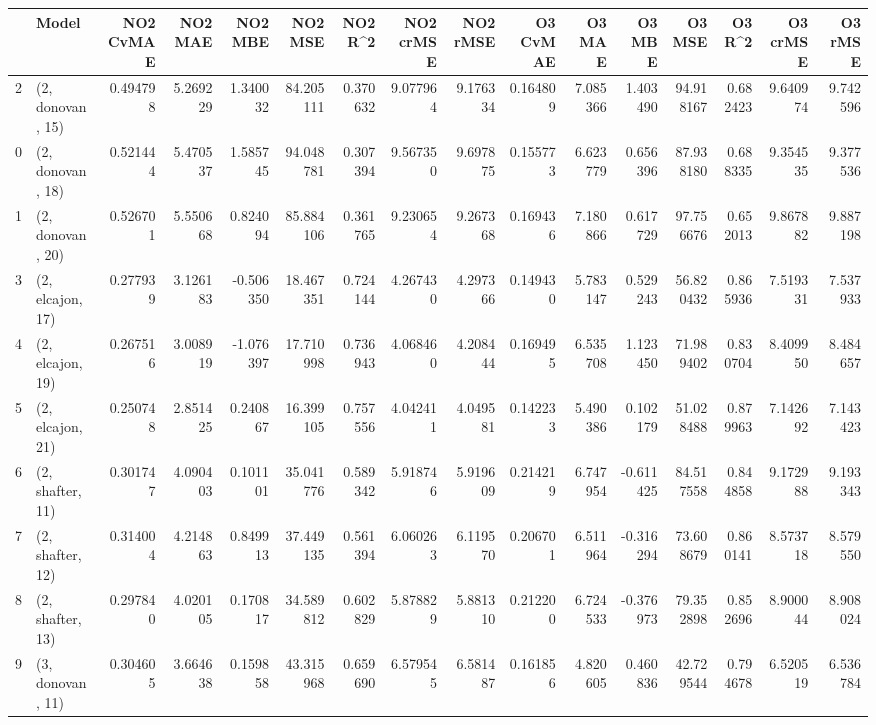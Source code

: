\begin{tabular}{llrrrrrrrrrrrrrr}
\toprule
{} &             Model &  NO2 CvMAE &   NO2 MAE &   NO2 MBE &     NO2 MSE &   NO2 R\textasciicircum2 &  NO2 crMSE &   NO2 rMSE &  O3 CvMAE &     O3 MAE &    O3 MBE &      O3 MSE &    O3 R\textasciicircum2 &   O3 crMSE &    O3 rMSE \\
\midrule
2  &  (2, donovan, 15) &   0.494798 &  5.269229 &  1.340032 &   84.205111 &  0.370632 &   9.077964 &   9.176334 &  0.164809 &   7.085366 &  1.403490 &   94.918167 &  0.682423 &   9.640974 &   9.742596 \\
0  &  (2, donovan, 18) &   0.521444 &  5.470537 &  1.585745 &   94.048781 &  0.307394 &   9.567350 &   9.697875 &  0.155773 &   6.623779 &  0.656396 &   87.938180 &  0.688335 &   9.354535 &   9.377536 \\
1  &  (2, donovan, 20) &   0.526701 &  5.550668 &  0.824094 &   85.884106 &  0.361765 &   9.230654 &   9.267368 &  0.169436 &   7.180866 &  0.617729 &   97.756676 &  0.652013 &   9.867882 &   9.887198 \\
3  &  (2, elcajon, 17) &   0.277939 &  3.126183 & -0.506350 &   18.467351 &  0.724144 &   4.267430 &   4.297366 &  0.149430 &   5.783147 &  0.529243 &   56.820432 &  0.865936 &   7.519331 &   7.537933 \\
4  &  (2, elcajon, 19) &   0.267516 &  3.008919 & -1.076397 &   17.710998 &  0.736943 &   4.068460 &   4.208444 &  0.169495 &   6.535708 &  1.123450 &   71.989402 &  0.830704 &   8.409950 &   8.484657 \\
5  &  (2, elcajon, 21) &   0.250748 &  2.851425 &  0.240867 &   16.399105 &  0.757556 &   4.042411 &   4.049581 &  0.142233 &   5.490386 &  0.102179 &   51.028488 &  0.879963 &   7.142692 &   7.143423 \\
6  &  (2, shafter, 11) &   0.301747 &  4.090403 &  0.101101 &   35.041776 &  0.589342 &   5.918746 &   5.919609 &  0.214219 &   6.747954 & -0.611425 &   84.517558 &  0.844858 &   9.172988 &   9.193343 \\
7  &  (2, shafter, 12) &   0.314004 &  4.214863 &  0.849913 &   37.449135 &  0.561394 &   6.060263 &   6.119570 &  0.206701 &   6.511964 & -0.316294 &   73.608679 &  0.860141 &   8.573718 &   8.579550 \\
8  &  (2, shafter, 13) &   0.297840 &  4.020105 &  0.170817 &   34.589812 &  0.602829 &   5.878829 &   5.881310 &  0.212200 &   6.724533 & -0.376973 &   79.352898 &  0.852696 &   8.900044 &   8.908024 \\
9  &  (3, donovan, 11) &   0.304605 &  3.664638 &  0.159858 &   43.315968 &  0.659690 &   6.579545 &   6.581487 &  0.161856 &   4.820605 &  0.460836 &   42.729544 &  0.794678 &   6.520519 &   6.536784 \\

\end{tabular}
